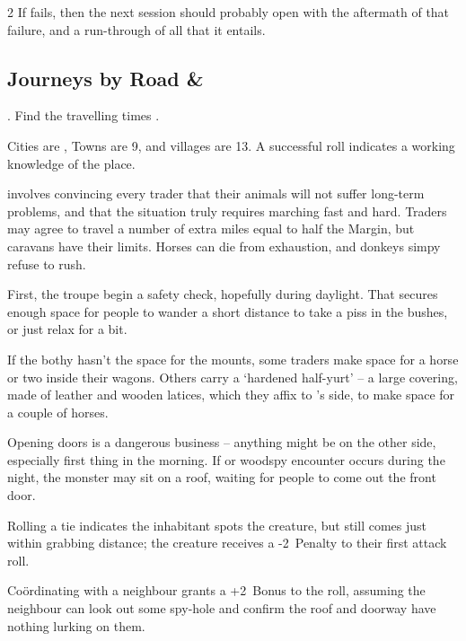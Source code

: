 \begin{multicols}{2}
{  If  fails, then the next session should probably open with the aftermath of that failure, and a run-through of all that it entails.
}{}

\subsection{Journeys by Road \& }

.
Find the travelling times .

Cities are \tn[7], Towns are 9, and \glspl{village} are 13.
A successful roll indicates a working knowledge of the place.

involves convincing every trader that their animals will not suffer long-term problems, and that the situation truly requires marching fast and hard.
Traders may agree to travel a number of extra miles equal to half the Margin, but caravans have their limits.
Horses can die from exhaustion, and donkeys simpy refuse to rush.

First, the troupe begin a safety check, hopefully during daylight.
That secures enough space for people to wander a short distance to take a piss in the bushes, or just relax for a bit.

If the \gls{bothy} hasn't the space for the mounts, some traders make space for a horse or two inside their wagons.
%
Others carry a `hardened half-yurt' -- a large covering, made of leather and wooden latices, which they affix to 's side, to make space for a couple of horses.

Opening doors is a dangerous business -- anything might be on the other side, especially first thing in the morning.
If  or \gls{woodspy} encounter occurs during the night, the \gls{monster} may sit on a roof, waiting for people to come out the front door.

Rolling a tie indicates the inhabitant spots the creature, but still comes just within grabbing distance; the creature receives a -2~Penalty to their first attack roll.

Co\"ordinating with a neighbour grants a +2~Bonus to the roll, assuming the neighbour can look out some spy-hole and confirm the roof and doorway have nothing lurking on them.


\end{multicols}
